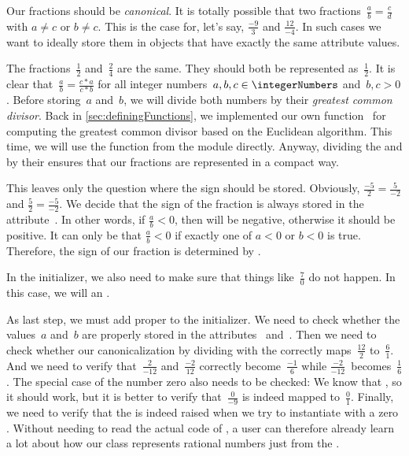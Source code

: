 Our fractions should be \emph{canonical}.
It is totally possible that two fractions~$\frac{a}{b}=\frac{c}{d}$ with $a\neq c$ or $b\neq c$.
This is the case for, let's say, $\frac{-9}{3}$ and $\frac{12}{-4}$.
In such cases we want to ideally store them in objects that have exactly the same attribute values.

The fractions~$\frac{1}{2}$ and~$\frac{2}{4}$ are the same.
They should both be represented as~$\frac{1}{2}$.
It is clear that~$\frac{a}{b}=\frac{c*a}{c*b}$ for all integer numbers~$a,b,c\in\integerNumbers$ and~$b,c>0$.
Before storing~$a$ and~$b$, we will divide both numbers by their \emph{greatest common divisor}.
Back in \cref{sec:definingFunctions}, we implemented our own function~ for computing the greatest common divisor based on the Euclidean algorithm.
This time, we will use the  function from the  module directly.
Anyway, dividing the  and  by their  ensures that our fractions are represented in a compact way.

This leaves only the question where the sign should be stored.
Obviously, $\frac{-5}{2}=\frac{5}{-2}$ and $\frac{5}{2}=\frac{-5}{-2}$.
We decide that the sign of the fraction is always stored in the attribute~.
In other words, if $\frac{a}{b}<0$, then  will be negative, otherwise it should be positive.
It can only be that $\frac{a}{b}<0$ if exactly one of $a<0$ or $b<0$ is true.
Therefore, the sign of our fraction is determined by .

In the initializer, we also need to make sure that things like~$\frac{7}{0}$ do not happen.
In this case, we will  an .

As last step, we must add proper  to the initializer.
We need to check whether the values~$a$ and~$b$ are properly stored in the attributes~ and~.
Then we need to check whether our canonicalization by dividing with the  correctly maps~$\frac{12}{2}$ to~$\frac{6}{1}$.
And we need to verify that~$\frac{2}{-12}$ and~$\frac{-2}{12}$ correctly become~$\frac{-1}{6}$ while $\frac{-2}{-12}$~becomes~$\frac{1}{6}$.
The special case of the number zero also needs to be checked:
We know that , so it should work, but it is better to verify that~$\frac{0}{-9}$ is indeed mapped to~$\frac{0}{1}$.
Finally, we need to verify that the  is indeed raised when we try to instantiate  with a zero .
Without needing to read the actual code of , a user can therefore already learn a lot about how our class  represents rational numbers just from the .

